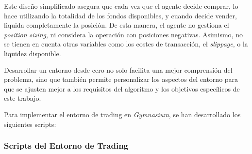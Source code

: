 \documentclass[a4paper,12pt, twoside]{report}
\begin{document}
Este diseño simplificado asegura que cada vez que el agente decide comprar, 
lo hace utilizando la totalidad de los fondos disponibles, y cuando decide vender, 
liquida completamente la posición. De esta manera, el agente no gestiona el 
\textit{position sizing}, ni considera la operación con posiciones negativas. 
Asimismo, no se tienen en cuenta otras variables como los costes de transacción, 
el \textit{slippage}, o la liquidez disponible.

Desarrollar un entorno desde cero no solo facilita una mejor comprensión del problema, 
sino que también permite personalizar los aspectos del entorno para que se ajusten mejor 
a los requisitos del algoritmo y los objetivos específicos de este trabajo.

Para implementar el entorno de trading en \textit{Gymnasium}, se han desarrollado 
los siguientes scripts:

\subsubsection{Scripts del Entorno de Trading}
\end{document}
